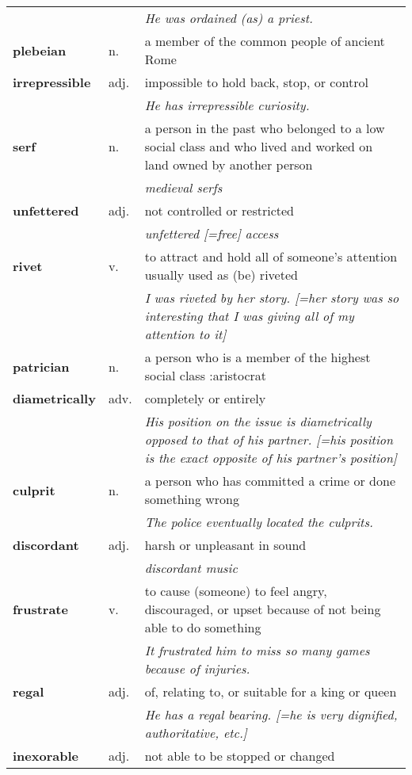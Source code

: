 \documentclass[a4paper]{article}
\begin{document}
\begin{longtable}{llp{11cm}}
 & & \textit{He was ordained (as) a priest.}\\[0.08cm]
\textbf{plebeian} & n. &  a member of the common people of ancient Rome\\[0.08cm]
\textbf{irrepressible} & adj. &  impossible to hold back, stop, or control \\
 & & \textit{He has irrepressible curiosity.}\\[0.08cm]
\textbf{serf} & n. &  a person in the past who belonged to a low social class and who lived and worked on land owned by another person \\
 & & \textit{medieval serfs}\\[0.08cm]
\textbf{unfettered} & adj. &  not controlled or restricted \\
 & & \textit{unfettered [=free] access}\\[0.08cm]
\textbf{rivet} & v. &  to attract and hold all of someone's attention usually used as (be) riveted \\
 & & \textit{I was riveted by her story. [=her story was so interesting that I was giving all of my attention to it]}\\[0.08cm]
\textbf{patrician} & n. &  a person who is a member of the highest social class :aristocrat\\[0.08cm]
\textbf{diametrically} & adv. &  completely or entirely \\
 & & \textit{His position on the issue is diametrically opposed to that of his partner. [=his position is the exact opposite of his partner's position]}\\[0.08cm]
\textbf{culprit} & n. &  a person who has committed a crime or done something wrong \\
 & & \textit{The police eventually located the culprits.}\\[0.08cm]
\textbf{discordant} & adj. &  harsh or unpleasant in sound \\
 & & \textit{discordant music}\\[0.08cm]
\textbf{frustrate} & v. &  to cause (someone) to feel angry, discouraged, or upset because of not being able to do something \\
 & & \textit{It frustrated him to miss so many games because of injuries.}\\[0.08cm]
\textbf{regal} & adj. &  of, relating to, or suitable for a king or queen \\
 & & \textit{He has a regal bearing. [=he is very dignified, authoritative, etc.]}\\[0.08cm]
\textbf{inexorable} & adj. &  not able to be stopped or changed \\

\end{longtable}
\end{document}
